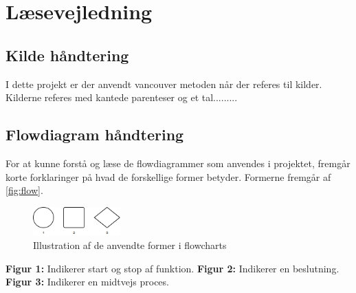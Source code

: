 \section{Læsevejledning}



\subsection{Kilde håndtering}
I dette projekt er der anvendt vancouver metoden når der referes til kilder. Kilderne referes med kantede parenteser og et tal.........



\subsection{Flowdiagram håndtering} \label{sec:flowhaandtering}
For at kunne forstå og læse de flowdiagrammer som anvendes i projektet, fremgår korte forklaringer på hvad de forskellige former betyder. Formerne fremgår af \autoref{fig:flow}.

\begin{figure}[H]
\centering
\includegraphics[width=0.3\textwidth]{figures/flow}
\caption{Illustration af de anvendte former i flowcharts}
\label{fig:flow}
\end{figure}

\textbf{Figur 1:} Indikerer start og stop af funktion.
\textbf{Figur 2:} Indikerer en beslutning.
\textbf{Figur 3:} Indikerer en midtvejs proces.